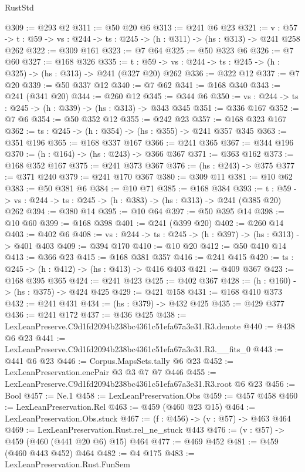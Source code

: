 \begin{lexlean}{RustStd}
\begin{coremodule}
@309 := @293 @2
@311 := @50 @20 @6
@313 := @241 @6 @23
@321 := {v : @57} ->
  {t : @59} -> {vs : @244} -> {ts : @245} -> (h : @311) -> (hs : @313) -> @241 @258 @262
@322 := @309 @161
@323 := @7 @64
@325 := @50 @323 @6
@326 := @7 @60
@327 := @168 @326
@335 := {t : @59} -> {vs : @244} -> {ts : @245} -> (h : @325) -> (hs : @313) -> @241 (@327 @20) @262
@336 := @322 @12
@337 := @7 @20
@339 := @50 @337 @12
@340 := @7 @62
@341 := @168 @340
@343 := @241 (@341 @20)
@344 := @260 @12
@345 := @344 @6
@350 := {vs : @244} -> {ts : @245} -> (h : @339) -> (hs : @313) -> @343 @345
@351 := @336 @167
@352 := @7 @6
@354 := @50 @352 @12
@355 := @242 @23
@357 := @168 @323 @167
@362 := {ts : @245} -> (h : @354) -> (hs : @355) -> @241 @357 @345
@363 := @351 @196
@365 := @168 @337 @167
@366 := @241 @365
@367 := @344 @196
@370 := (h : @164) -> (hs : @243) -> @366 @367
@371 := @363 @162
@373 := @168 @352 @167
@375 := @241 @373 @367
@376 := (hs : @243) -> @375
@377 := @371 @240
@379 := @241 @170 @367
@380 := @309 @11
@381 := @10 @62
@383 := @50 @381 @6
@384 := @10 @71
@385 := @168 @384
@393 := {t : @59} -> {vs : @244} -> {ts : @245} -> (h : @383) -> (hs : @313) -> @241 (@385 @20) @262
@394 := @380 @14
@395 := @10 @64
@397 := @50 @395 @14
@398 := @10 @60
@399 := @168 @398
@401 := @241 (@399 @20)
@402 := @260 @14
@403 := @402 @6
@408 := {vs : @244} -> {ts : @245} -> (h : @397) -> (hs : @313) -> @401 @403
@409 := @394 @170
@410 := @10 @20
@412 := @50 @410 @14
@413 := @366 @23
@415 := @168 @381 @357
@416 := @241 @415
@420 := {ts : @245} -> (h : @412) -> (hs : @413) -> @416 @403
@421 := @409 @367
@423 := @168 @395 @365
@424 := @241 @423
@425 := @402 @367
@428 := (h : @160) -> (hs : @375) -> @424 @425
@429 := @421 @158
@431 := @168 @410 @373
@432 := @241 @431
@434 := (hs : @379) -> @432 @425
@435 := @429 @377
@436 := @241 @172
@437 := @436 @425
@438 := LexLeanPreserve.C9d1fd2094b238bc4361c51efa67a3e31.R3.denote
@440 := @438 @6 @23
@441 := LexLeanPreserve.C9d1fd2094b238bc4361c51efa67a3e31.R3.__fits_0
@443 := @441 @6 @23
@446 := Corpus.MapsSets.tally @6 @23
@452 := LexLeanPreservation.encPair @3 @3 @7 @7 @446
@455 := LexLeanPreserve.C9d1fd2094b238bc4361c51efa67a3e31.R3.root @6 @23
@456 := Bool
@457 := Ne.{1}
@458 := LexLeanPreservation.Obs
@459 := @457 @458
@460 := LexLeanPreservation.Rel
@463 := @459 (@460 @23 @15)
@464 := LexLeanPreservation.Obs.stuck
@467 := (f : @456) -> (v : @57) -> @463 @464
@469 := LexLeanPreservation.Rust.rel_ne_stuck @443
@476 := (v : @57) -> @459 (@460 (@441 @20 @6) @15) @464
@477 := @469 @452
@481 := @459 (@460 @443 @452) @464
@482 := @4 @175
@483 := LexLeanPreservation.Rust.FunSem

\end{coremodule}
\end{lexlean}
